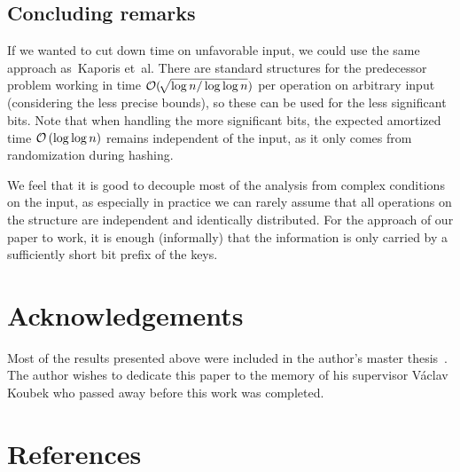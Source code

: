 \documentclass[twoside,english,preprint]{elsarticle}
\theoremstyle{plain}
\theoremstyle{definition}
\theoremstyle{remark}
\theoremstyle{plain}
\theoremstyle{plain}
\begin{document}
\subsection{Concluding remarks}

If we wanted to cut down time on unfavorable input, we could use the
same approach as~Kaporis et~al. There are standard structures for
the predecessor problem working in time $\mathcal O(\!\sqrt{\log n/\log\log n})$
per operation on arbitrary input (considering the less precise bounds),
so these can be used for the less significant bits. Note that when
handling the more significant bits, the expected amortized time $\mathcal O\left(\log\log n\right)$
remains independent of the input, as it only comes from randomization
during hashing.

We feel that it is good to decouple most of the analysis from complex
conditions on the input, as especially in practice we can rarely assume
that all operations on the structure are independent and identically
distributed. For the approach of our paper to work, it is enough (informally)
that the information is only carried by a sufficiently short bit prefix
of the keys.

\section*{Acknowledgements}

Most of the results presented above were included in the author's master thesis~\cite{Cunat10}. The author wishes to dedicate this paper to the memory of his supervisor V\'aclav Koubek who passed away before this work was completed.


\section*{References}


\end{document}
